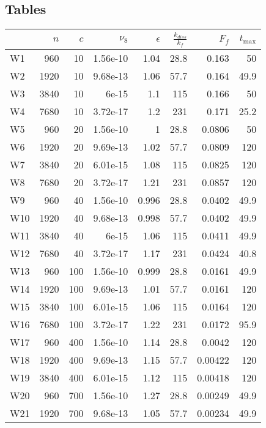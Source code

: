 \documentclass[a4paper]{article}
\begin{document}
\subsection{Tables}
\begin{tabular}{lrrrrrrr}
\toprule
{} &   $n$ &  $c$ &  $\nu_8$ &  $\epsilon$ &  $\frac{k_{diss}}{k_f}$ &   $F_f$ &  $t_{\max}$ \\
\midrule
W1  &   960 &   10 & 1.56e-10 &        1.04 &                    28.8 &   0.163 &          50 \\
W2  &  1920 &   10 & 9.68e-13 &        1.06 &                    57.7 &   0.164 &        49.9 \\
W3  &  3840 &   10 &    6e-15 &         1.1 &                     115 &   0.166 &          50 \\
W4  &  7680 &   10 & 3.72e-17 &         1.2 &                     231 &   0.171 &        25.2 \\
W5  &   960 &   20 & 1.56e-10 &           1 &                    28.8 &  0.0806 &          50 \\
W6  &  1920 &   20 & 9.69e-13 &        1.02 &                    57.7 &  0.0809 &         120 \\
W7  &  3840 &   20 & 6.01e-15 &        1.08 &                     115 &  0.0825 &         120 \\
W8  &  7680 &   20 & 3.72e-17 &        1.21 &                     231 &  0.0857 &         120 \\
W9  &   960 &   40 & 1.56e-10 &       0.996 &                    28.8 &  0.0402 &        49.9 \\
W10 &  1920 &   40 & 9.68e-13 &       0.998 &                    57.7 &  0.0402 &        49.9 \\
W11 &  3840 &   40 &    6e-15 &        1.06 &                     115 &  0.0411 &        49.9 \\
W12 &  7680 &   40 & 3.72e-17 &        1.17 &                     231 &  0.0424 &        40.8 \\
W13 &   960 &  100 & 1.56e-10 &       0.999 &                    28.8 &  0.0161 &        49.9 \\
W14 &  1920 &  100 & 9.69e-13 &        1.01 &                    57.7 &  0.0161 &         120 \\
W15 &  3840 &  100 & 6.01e-15 &        1.06 &                     115 &  0.0164 &         120 \\
W16 &  7680 &  100 & 3.72e-17 &        1.22 &                     231 &  0.0172 &        95.9 \\
W17 &   960 &  400 & 1.56e-10 &        1.14 &                    28.8 &  0.0042 &         120 \\
W18 &  1920 &  400 & 9.69e-13 &        1.15 &                    57.7 & 0.00422 &         120 \\
W19 &  3840 &  400 & 6.01e-15 &        1.12 &                     115 & 0.00418 &         120 \\
W20 &   960 &  700 & 1.56e-10 &        1.27 &                    28.8 & 0.00249 &        49.9 \\
W21 &  1920 &  700 & 9.68e-13 &        1.05 &                    57.7 & 0.00234 &        49.9 \\
\bottomrule
\end{tabular}
\end{document}
